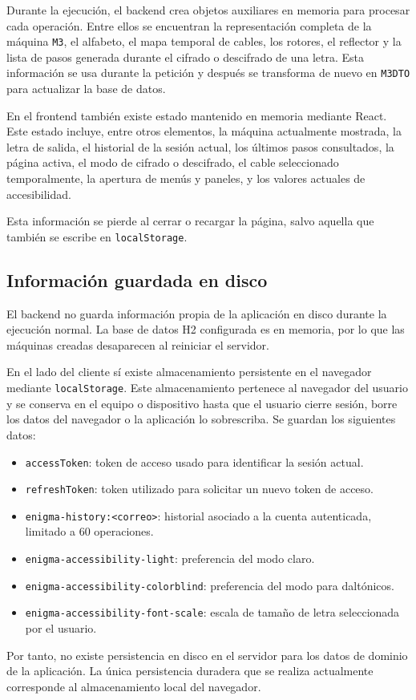 Durante la ejecución, el backend crea objetos auxiliares en memoria para procesar cada operación. Entre ellos se encuentran la representación completa de la máquina \texttt{M3}, el alfabeto, el mapa temporal de cables, los rotores, el reflector y la lista de pasos generada durante el cifrado o descifrado de una letra. Esta información se usa durante la petición y después se transforma de nuevo en \texttt{M3DTO} para actualizar la base de datos.

En el frontend también existe estado mantenido en memoria mediante React. Este estado incluye, entre otros elementos, la máquina actualmente mostrada, la letra de salida, el historial de la sesión actual, los últimos pasos consultados, la página activa, el modo de cifrado o descifrado, el cable seleccionado temporalmente, la apertura de menús y paneles, y los valores actuales de accesibilidad.

Esta información se pierde al cerrar o recargar la página, salvo aquella que también se escribe en \texttt{localStorage}.

\subsection{Información guardada en disco}

El backend no guarda información propia de la aplicación en disco durante la ejecución normal. La base de datos H2 configurada es en memoria, por lo que las máquinas creadas desaparecen al reiniciar el servidor.

En el lado del cliente sí existe almacenamiento persistente en el navegador mediante \texttt{localStorage}. Este almacenamiento pertenece al navegador del usuario y se conserva en el equipo o dispositivo hasta que el usuario cierre sesión, borre los datos del navegador o la aplicación lo sobrescriba. Se guardan los siguientes datos:

\begin{itemize}
    \item \texttt{accessToken}: token de acceso usado para identificar la sesión actual.

    \item \texttt{refreshToken}: token utilizado para solicitar un nuevo token de acceso.

    \item \texttt{enigma-history:\textless correo\textgreater}: historial asociado a la cuenta autenticada, limitado a 60 operaciones.

    \item \texttt{enigma-accessibility-light}: preferencia del modo claro.

    \item \texttt{enigma-accessibility-colorblind}: preferencia del modo para daltónicos.

    \item \texttt{enigma-accessibility-font-scale}: escala de tamaño de letra seleccionada por el usuario.
\end{itemize}

Por tanto, no existe persistencia en disco en el servidor para los datos de dominio de la aplicación. La única persistencia duradera que se realiza actualmente corresponde al almacenamiento local del navegador.
